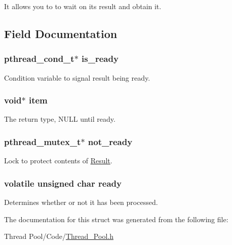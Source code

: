 It allows you to to wait on it\textquotesingle{}s result and obtain it. 

\subsection{Field Documentation}
\hypertarget{struct_result_a8f707934732f685f1b1b53a855de60d4}{}
\subsubsection[{is\+\_\+ready}]{\setlength{\rightskip}{0pt plus 5cm}pthread\+\_\+cond\+\_\+t$\ast$ is\+\_\+ready}\label{struct_result_a8f707934732f685f1b1b53a855de60d4}


Condition variable to signal result being ready. 

\hypertarget{struct_result_aeeeae972d4d97226aa998aa9ca91346c}{}
\subsubsection[{item}]{\setlength{\rightskip}{0pt plus 5cm}void$\ast$ item}\label{struct_result_aeeeae972d4d97226aa998aa9ca91346c}


The return type, N\+U\+L\+L until ready. 

\hypertarget{struct_result_a29a502fc8aca81df1310e7c10c3d99af}{}
\subsubsection[{not\+\_\+ready}]{\setlength{\rightskip}{0pt plus 5cm}pthread\+\_\+mutex\+\_\+t$\ast$ not\+\_\+ready}\label{struct_result_a29a502fc8aca81df1310e7c10c3d99af}


Lock to protect contents of \textquotesingle{}\hyperlink{struct_result}{Result}\textquotesingle{}. 

\hypertarget{struct_result_a7ad32217267e7e0144abffa4e782867c}{}
\subsubsection[{ready}]{\setlength{\rightskip}{0pt plus 5cm}volatile unsigned char ready}\label{struct_result_a7ad32217267e7e0144abffa4e782867c}


Determines whether or not it has been processed. 



The documentation for this struct was generated from the following file\+:\begin{DoxyCompactItemize}
\item 
Thread Pool/\+Code/\hyperlink{_thread___pool_8h}{Thread\+\_\+\+Pool.\+h}\end{DoxyCompactItemize}
